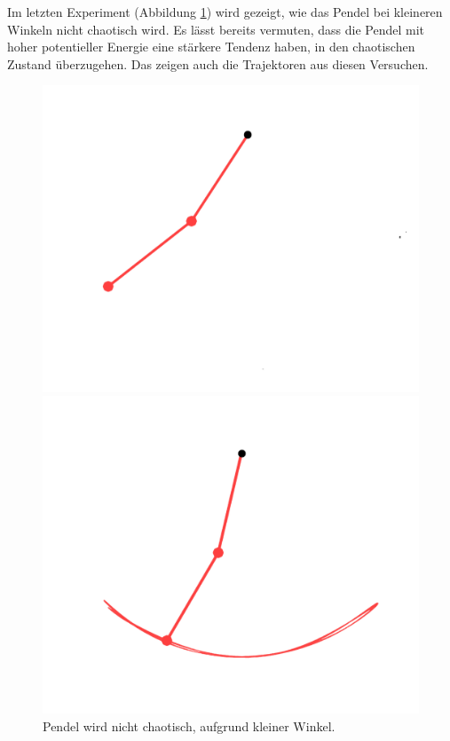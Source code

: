 Im letzten Experiment (Abbildung \ref{fig:pendel_nichtchaotisch}) wird gezeigt,
wie das Pendel bei kleineren Winkeln nicht chaotisch wird.
Es lässt bereits vermuten, dass die Pendel mit hoher potentieller Energie eine stärkere Tendenz haben,
in den chaotischen Zustand überzugehen.
Das zeigen auch die Trajektoren aus diesen Versuchen.
\begin{figure}
    \centering
    \begin{minipage}{0.45\textwidth}
        \centering
        \includegraphics[width=\textwidth]{papers/doppelpendel/images/pendel_stand_nichtchaotisch.png}
    \end{minipage}
    \hfill
    \begin{minipage}{0.45\textwidth}
        \centering
        \includegraphics[width=\textwidth]{papers/doppelpendel/images/pendel_spur_nichtchaotisch.png}
    \end{minipage}
    \caption{Pendel wird nicht chaotisch, aufgrund kleiner Winkel.}
    \label{fig:pendel_nichtchaotisch}
\end{figure}

